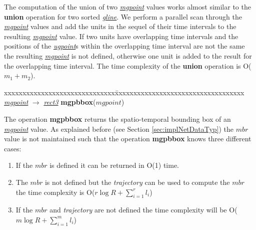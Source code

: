 \documentclass[a4paper]{article}
\newcommand{\op}[1]{\textbf{#1}}
\newcommand{\dt}[1]{\textsl{\underline{#1}}}
\begin{document}
The computation of the union of two \dt{mgpoint} values works almost similar to
the \op{union} operation for two sorted \dt{gline}. We perform a parallel scan
through the \dt{mgpoint} values and add the units in the sequel of their time
intervals to the resulting \dt{mgpoint} value. If two units have overlapping
time
intervals and the positions of the \dt{ugpoint}s within the overlapping time
interval are not the same the resulting \dt{mgpoint} is not defined, otherwise
one unit is added to the result for the overlapping time interval. The time
complexity of the \op{union} operation is O($m_1 + m_2$).

\begin{tabbing}
xxxxxxxxxxxxxxxxxxxxxxxxxxxxxx\=xxxxxxxxxxxxxxxxxxxxxxxxxxxxxxxxxxx\kill
\dt{mgpoint} $\rightarrow$ \dt{rect3} \> \op{mgpbbox}($mgpoint$)\\
\end{tabbing}
The operation \op{mgpbbox} returns the spatio-temporal bounding box of an
\dt{mgpoint} value. As explained before (see Section \ref{sec:implNetDataTyp})
the $mbr$ value is not maintained such that the operation \op{mgpbbox} knows
three different cases:
\begin{enumerate}
  \item If the $mbr$ is defined it can be returned in O(1) time.
  \item The $mbr$ is not defined but the \textit{trajectory} can be used to compute the
$mbr$ the time complexity is O($r \log {R} + \sum_{i=1}^{r}{l_i}$)
  \item If the $mbr$ and \textit{trajectory} are not defined the time complexity will
be
O($m \log {R} + \sum_{i=1}^{m}{l_i}$)
\end{enumerate}
\end{document}
